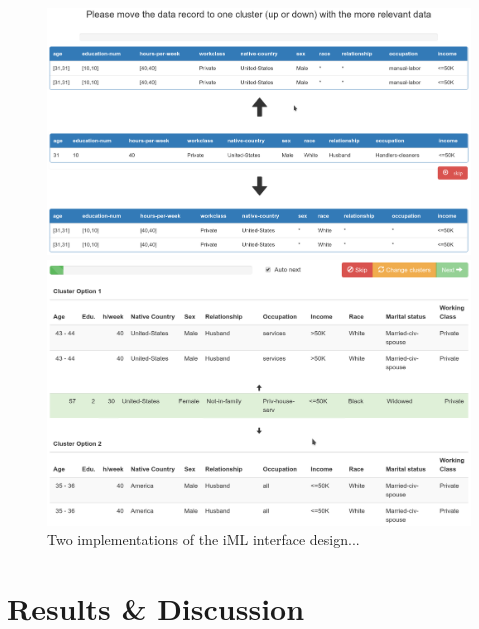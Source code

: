 \documentclass{llncs}
\begin{document}
\begin{figure}[!t]
	\begin{center}
		\vspace{-1.0cm}
    	\hspace*{-0.8cm}
		\includegraphics[width=1.0\textwidth]{figures/iml_anon_screen1}
		
		\vspace{1.0cm}
		\hspace*{-0.8cm}
		\includegraphics[width=1.0\textwidth]{figures/iml_anon_screen2}
		\caption{Two implementations of the iML interface design...}
		\label{fig:adult_important_columns}
	\end{center}
\end{figure}


\section{Results \& Discussion}
\label{sect:results}
\end{document}
